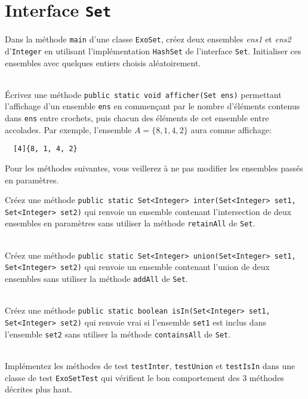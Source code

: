 \documentclass[iutinfo,a4paper,10pt]{ustl-tdtp}
\date{\annee{2017}--\annee{2018}}
\begin{document}

\maketitle
\thispagestyle{empty}

\section{Interface \texttt{Set}}
\sloppy

\question Dans la méthode \texttt{main} d'une classe \texttt{ExoSet}, créez deux ensembles {\it ens1} et {\it ens2} d'\texttt{Integer} en utilisant l'implémentation \texttt{HashSet} de l'interface \texttt{Set}. Initialiser ces ensembles avec quelques entiers choisis aléatoirement.

~\\ \question Écrivez une méthode \texttt{public static void afficher(Set
  ens)} permettant l'affichage d'un ensemble \texttt{ens} en
commençant par le nombre d'éléments contenus dans \texttt{ens} entre
crochets, puis chacun des éléments de cet ensemble entre accolades. Par exemple, l'ensemble $A=\{8,1,4,2\}$ aura comme affichage: 
\begin{verbatim}
  [4]{8, 1, 4, 2}
\end{verbatim}

Pour les méthodes suivantes, vous veillerez à ne pas modifier les ensembles passés en paramètres.

\question Créez une méthode \texttt{public static Set<Integer> inter(Set<Integer> set1, Set<Integer> set2)} qui renvoie un ensemble contenant l'intersection de deux ensembles en paramètres sans utiliser la méthode \texttt{retainAll} de \texttt{Set}.

~\\ \question Créez une méthode \texttt{public static Set<Integer> union(Set<Integer> set1, Set<Integer> set2)} qui renvoie un ensemble contenant l'union de deux ensembles sans utiliser la méthode \texttt{addAll} de \texttt{Set}.

~\\ \question Créez une méthode \texttt{public static boolean
  isIn(Set<Integer> set1, Set<Integer> set2)} qui renvoie vrai si
l'ensemble \texttt{set1} est inclus dans l'ensemble \texttt{set2} sans utiliser la méthode \texttt{containsAll} de \texttt{Set}.

~\\ \question Implémentez les méthodes de test \texttt{testInter}, \texttt{testUnion} et \texttt{testIsIn} dans une classe de test \texttt{ExoSetTest} qui vérifient le bon comportement des 3 méthodes décrites plus haut. 
\end{document}
